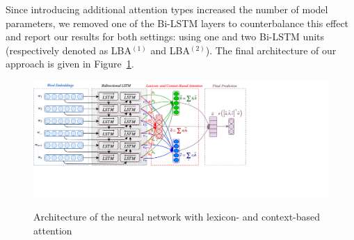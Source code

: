 Since introducing additional attention types increased the number of
model parameters, we removed one of the Bi-LSTM layers to
counterbalance this effect and report our results for both settings:
using one and two Bi-LSTM units (respectively denoted as LBA$^{(1)}$
and LBA$^{(2)}$).  The final architecture of our approach is given in
Figure~\ref{cgsa:fig:lba}.



\begin{figure}[htbp!]
{ \centering \includegraphics[width=1.3\linewidth]{img/lba.png} }
\caption[Neural network with lexicon-based attention]{Architecture of
  the neural network with lexicon- and context-based
  attention}\label{cgsa:fig:lba}
\end{figure}


